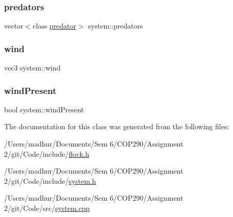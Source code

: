 \subsubsection{\texorpdfstring{predators}{predators}\hspace{0.1cm}{\footnotesize\ttfamily [2/2]}}
{\footnotesize\ttfamily vector$<$class \mbox{\hyperlink{classpredator}{predator}}$>$ system\+::predators\hspace{0.3cm}{\ttfamily [private]}}

\mbox{\label{classsystem_af0a770a1cd0b1eef642a2ebef4cafd25}} 
\subsubsection{\texorpdfstring{wind}{wind}}
{\footnotesize\ttfamily vec3 system\+::wind\hspace{0.3cm}{\ttfamily [private]}}

\mbox{\label{classsystem_a8a63cc2b9860bde768b6c58758c30f7b}} 
\subsubsection{\texorpdfstring{wind\+Present}{windPresent}}
{\footnotesize\ttfamily bool system\+::wind\+Present\hspace{0.3cm}{\ttfamily [private]}}



The documentation for this class was generated from the following files\+:\begin{DoxyCompactItemize}
\item 
/\+Users/madhur/\+Documents/\+Sem 6/\+C\+O\+P290/\+Assignment 2/git/\+Code/include/\mbox{\hyperlink{flock_8h}{flock.\+h}}\item 
/\+Users/madhur/\+Documents/\+Sem 6/\+C\+O\+P290/\+Assignment 2/git/\+Code/include/\mbox{\hyperlink{system_8h}{system.\+h}}\item 
/\+Users/madhur/\+Documents/\+Sem 6/\+C\+O\+P290/\+Assignment 2/git/\+Code/src/\mbox{\hyperlink{system_8cpp}{system.\+cpp}}\end{DoxyCompactItemize}
